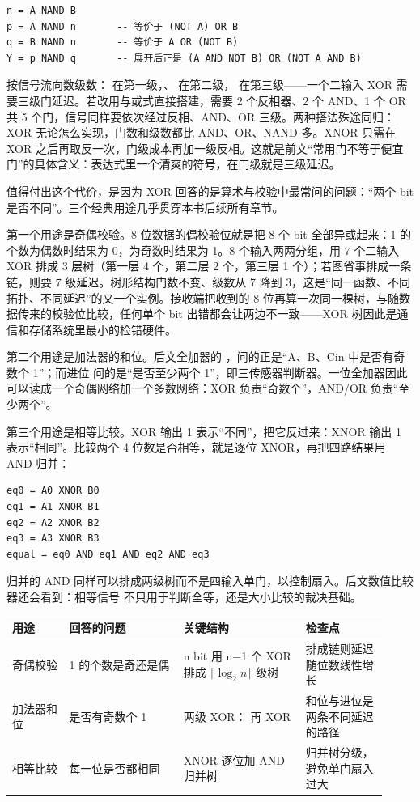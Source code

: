 \begin{lstlisting}
n = A NAND B
p = A NAND n       -- 等价于 (NOT A) OR B
q = B NAND n       -- 等价于 A OR (NOT B)
Y = p NAND q       -- 展开后正是 (A AND NOT B) OR (NOT A AND B)
\end{lstlisting}

按信号流向数级数： 在第一级，、 在第二级， 在第三级——一个二输入 XOR 需要三级门延迟。若改用与或式直接搭建，需要 2 个反相器、2 个 AND、1 个 OR 共 5 个门，信号同样要依次经过反相、AND、OR 三级。两种搭法殊途同归：XOR 无论怎么实现，门数和级数都比 AND、OR、NAND 多。XNOR 只需在 XOR 之后再取反一次，门级成本再加一级反相。这就是前文“常用门不等于便宜门”的具体含义：表达式里一个清爽的符号，在门级就是三级延迟。

值得付出这个代价，是因为 XOR 回答的是算术与校验中最常问的问题：“两个 bit 是否不同”。三个经典用途几乎贯穿本书后续所有章节。

第一个用途是奇偶校验。8 位数据的偶校验位就是把 8 个 bit 全部异或起来：1 的个数为偶数时结果为 0，为奇数时结果为 1。8 个输入两两分组，用 7 个二输入 XOR 排成 3 层树（第一层 4 个，第二层 2 个，第三层 1 个）；若图省事排成一条链，则要 7 级延迟。树形结构门数不变、级数从 7 降到 3，这是“同一函数、不同拓扑、不同延迟”的又一个实例。接收端把收到的 8 位再算一次同一棵树，与随数据传来的校验位比较，任何单个 bit 出错都会让两边不一致——XOR 树因此是通信和存储系统里最小的检错硬件。

第二个用途是加法器的和位。后文全加器的 ，问的正是“A、B、Cin 中是否有奇数个 1”；而进位  问的是“是否至少两个 1”，即三传感器判断器。一位全加器因此可以读成一个奇偶网络加一个多数网络：XOR 负责“奇数个”，AND/OR 负责“至少两个”。

第三个用途是相等比较。XOR 输出 1 表示“不同”，把它反过来：XNOR 输出 1 表示“相同”。比较两个 4 位数是否相等，就是逐位 XNOR，再把四路结果用 AND 归并：

\begin{lstlisting}
eq0 = A0 XNOR B0
eq1 = A1 XNOR B1
eq2 = A2 XNOR B2
eq3 = A3 XNOR B3
equal = eq0 AND eq1 AND eq2 AND eq3
\end{lstlisting}

归并的 AND 同样可以排成两级树而不是四输入单门，以控制扇入。后文数值比较器还会看到：相等信号  不只用于判断全等，还是大小比较的裁决基础。

\begin{longtable}{L{0.14\linewidth}L{0.28\linewidth}L{0.3\linewidth}L{0.2\linewidth}}
\toprule
用途 & 回答的问题 & 关键结构 & 检查点 \\
\midrule
奇偶校验 & 1 的个数是奇还是偶 & n bit 用 n$-$1 个 XOR 排成 $\lceil\log_2 n\rceil$ 级树 & 排成链则延迟随位数线性增长 \\
加法器和位 & 是否有奇数个 1 & 两级 XOR： 再 XOR  & 和位与进位是两条不同延迟的路径 \\
相等比较 & 每一位是否都相同 & XNOR 逐位加 AND 归并树 & 归并树分级，避免单门扇入过大 \\
\bottomrule
\end{longtable}

